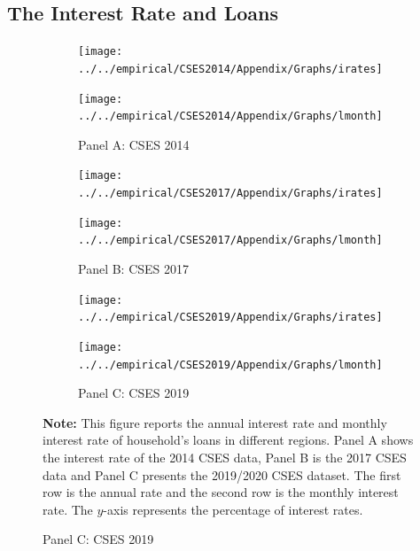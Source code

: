 \documentclass[11pt,letterpaper]{article}
\begin{document}
\subsection{The Interest Rate and Loans}\label{sec:appirate}
\begin{figure}[H]
	\caption{The annual interest rate and monthly interest rate of household liabilities }
	\label{fig:appirate}
	\begin{subfigure}[b]{0.33\linewidth}
		\caption*{Panel A: CSES 2014} \vspace{-.5em}
		\texttt{[image: ../../empirical/CSES2014/Appendix/Graphs/irates]} 
		\vspace{-2.5em}
		\newline {}
		
		\texttt{[image: ../../empirical/CSES2014/Appendix/Graphs/lmonth]} 
		\vspace{-2.5em}
		\newline {}
		
	\end{subfigure}%
	\hfil
	\begin{subfigure}[b]{0.33\linewidth}
		\caption*{Panel B: CSES 2017} \vspace{-.5em}
		\texttt{[image: ../../empirical/CSES2017/Appendix/Graphs/irates]} 
		\vspace{-2.5em}
		\newline {}
		
		\texttt{[image: ../../empirical/CSES2017/Appendix/Graphs/lmonth]}
		\vspace{-2.5em}
		\newline {}
	\end{subfigure}
	\hfil
	\begin{subfigure}[b]{0.33\linewidth}
		\caption*{Panel C: CSES 2019} \vspace{-.5em}
		\texttt{[image: ../../empirical/CSES2019/Appendix/Graphs/irates]} 
		\vspace{-2.5em}
		\newline {}
		
		\texttt{[image: ../../empirical/CSES2019/Appendix/Graphs/lmonth]} 
		\vspace{-2.5em}
		\newline {}
	\end{subfigure}
	\begin{tablenotes}
		\footnotesize
		\item \textbf{Note:} This figure reports the annual interest rate and monthly interest rate of household's loans in different regions. Panel A shows the interest rate of the 2014 CSES data, Panel B is the 2017 CSES data and Panel C presents the 2019/2020 CSES dataset. The first row is the annual rate and the second row is the monthly interest rate. The $y$-axis represents the percentage of interest rates.   
		
	\end{tablenotes} 
	
	
\end{figure}
\end{document}
